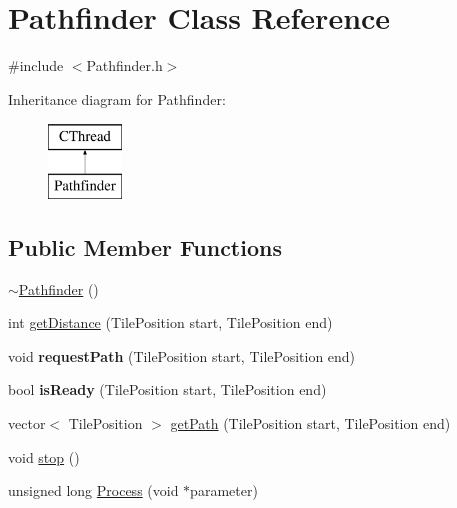 \hypertarget{class_pathfinder}{\section{Pathfinder Class Reference}
\label{class_pathfinder}
}


{\ttfamily \#include $<$Pathfinder.\-h$>$}

Inheritance diagram for Pathfinder\-:\begin{figure}[H]
\begin{center}
\leavevmode
\includegraphics[height=2.000000cm]{class_pathfinder}
\end{center}
\end{figure}
\subsection*{Public Member Functions}
\begin{DoxyCompactItemize}
\item 
\hyperlink{class_pathfinder_a5b39561ad7375cfdc493d58cbb9fdc1b}{$\sim$\-Pathfinder} ()
\item 
int \hyperlink{class_pathfinder_a1ed4dafd51a8eedb2f3159c18950a52e}{get\-Distance} (Tile\-Position start, Tile\-Position end)
\item 
\hypertarget{class_pathfinder_afa77218f0b90cc818218c897621d8e62}{void {\bfseries request\-Path} (Tile\-Position start, Tile\-Position end)}\label{class_pathfinder_afa77218f0b90cc818218c897621d8e62}

\item 
\hypertarget{class_pathfinder_ac54cfce251c9e7730e747b024cf0f421}{bool {\bfseries is\-Ready} (Tile\-Position start, Tile\-Position end)}\label{class_pathfinder_ac54cfce251c9e7730e747b024cf0f421}

\item 
vector$<$ Tile\-Position $>$ \hyperlink{class_pathfinder_a2a6e818ed33335b67863d8da97003dba}{get\-Path} (Tile\-Position start, Tile\-Position end)
\item 
void \hyperlink{class_pathfinder_a3c84fc45c5478079cddcee0929749494}{stop} ()
\item 
unsigned long \hyperlink{class_pathfinder_affcc7b9fcf249de527987eff60ddbea7}{Process} (void $\ast$parameter)
\end{DoxyCompactItemize}
